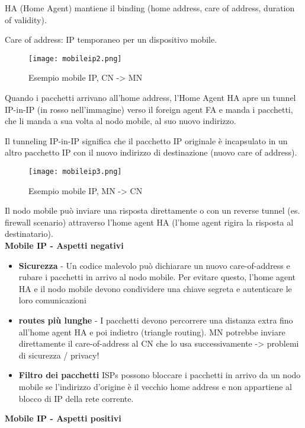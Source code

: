 HA (Home Agent) mantiene il binding (home address, care of address,
duration of validity).

Care of address: IP temporaneo per un dispositivo mobile.

\begin{figure}[H]
  \centering
  \texttt{[image: mobileip2.png]}
  \caption{Esempio mobile IP, CN -> MN}
  \label{fig:mobileip2}
\end{figure}

Quando i pacchetti arrivano all'home address, l'Home Agent HA apre un tunnel
IP-in-IP (in rosso nell'immagine) verso il foreign agent FA e manda i 
pacchetti, che li manda a sua volta al nodo mobile, al suo nuovo indirizzo.

Il tunneling IP-in-IP significa che il pacchetto IP originale è incapsulato
in un altro pacchetto IP con il nuovo indirizzo di destinazione (nuovo care
of address).

\begin{figure}[H]
  \centering
  \texttt{[image: mobileip3.png]}
  \caption{Esempio mobile IP, MN -> CN}
  \label{fig:mobileip3}
\end{figure}

Il nodo mobile può inviare una risposta direttamente o con un
reverse tunnel (es. firewall scenario) attraverso l'home agent HA
(l'home agent rigira la risposta al destinatario). \\

\textbf{Mobile IP - Aspetti negativi}

\begin{itemize}
  \item \textbf{Sicurezza} - Un codice malevolo può
dichiarare un nuovo care-of-address e rubare i pacchetti in arrivo
al nodo mobile.
Per evitare questo, l'home agent HA e il nodo mobile devono condividere
una chiave segreta e autenticare le loro comunicazioni
  \item \textbf{routes più lunghe} - I pacchetti devono percorrere una
distanza extra fino all'home agent HA e poi indietro (triangle routing).
MN potrebbe inviare direttamente il care-of-address al CN
che lo usa successivamente -> problemi di sicurezza / privacy!
  \item \textbf{Filtro dei pacchetti}
ISPs possono bloccare i pacchetti in arrivo da un nodo mobile se l'indirizzo
d'origine è il vecchio home address e non appartiene al blocco di IP della
rete corrente.
\end{itemize}

\textbf{Mobile IP - Aspetti positivi}

